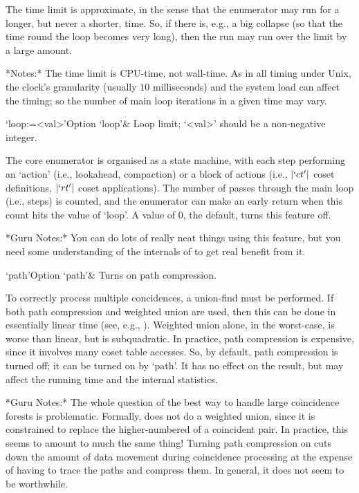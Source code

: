 The time  limit is approximate, in  the sense that  the enumerator may
run for a longer, but never a shorter, time.  So, if there is, e.g., a
big collapse (so that the time round the loop becomes very long), then
the run may run over the limit by a large amount.

*Notes:*
The time limit is CPU-time, not wall-time.  As  in  all  timing  under
Unix, the clock's granularity  (usually  $10$  milliseconds)  and  the
system load can  affect  the  timing;  so  the  number  of  main  loop
iterations in a given time may vary.

\>`loop:=<val>'{Option `loop'}&
Loop limit; `<val>' should be a non-negative integer.

The core enumerator is organised as a state machine,  with  each  step
performing an \lq{}action' (i.e., lookahead, compaction) or a block of
actions   (i.e.,   $|`ct'|$   coset   definitions,   $|`rt'|$    coset
applications). The number of  passes  through  the  main  loop  (i.e.,
steps) is counted, and the enumerator can make an  early  return  when
this count hits the value of `loop'. A  value  of  $0$,  the  default,
turns this feature off.

*Guru Notes:*
You can do lots of really neat things using this feature, but you need
some understanding of the internals of {\ACE} to get real benefit from
it.

\>`path'{Option `path'}&
Turns on path compression.

To correctly  process  multiple  concidences,  a  union-find  must  be
performed. If both path compression and weighted union are used,  then
this can be done in essentially linear time (see, e.g., \cite{CLR90}).
Weighted union alone, in the worst-case, is worse than linear, but  is
subquadratic. In practice, path compression  is  expensive,  since  it
involves many coset table accesses. So, by default,  path  compression
is turned off; it can be turned on by `path'. It has no effect on  the
result, but may affect the running time and the internal statistics.

*Guru Notes:*
The whole question of the best way to handle large coincidence forests
is problematic.  Formally, {\ACE} does  not do a weighted union, since
it is constrained to replace the higher-numbered of a coincident pair.
In practice,  this seems  to amount to  much the same  thing!  Turning
path  compression on  cuts down  the  amount of  data movement  during
coincidence processing at the expense of having to trace the paths and
compress them.  In general, it does not seem to be worthwhile.

